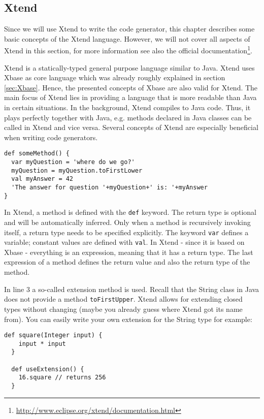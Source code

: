 \subsection{Xtend}
 
Since we will use Xtend to write the code generator, this chapter describes some
basic concepts of the Xtend language. However, we will not cover all aspects of
Xtend in this section, for more information see also the official documentation\footnote{\url{http://www.eclipse.org/xtend/documentation.html}}.

Xtend is a statically-typed general purpose language similar to Java. Xtend uses
Xbase as core language which was already roughly explained in section \ref{sec:Xbase}.
Hence, the presented concepts of Xbase are also valid for Xtend. The main focus
of Xtend lies in providing a language that is more readable than Java in certain
situations. In the background, Xtend compiles to Java code. Thus, it plays
perfectly together with Java, e.g. methods declared in Java classes can be called in Xtend
and vice versa. Several concepts of Xtend are especially beneficial when writing code
generators. 

\begin{lstlisting}[language=Xtend]
def someMethod() {
  var myQuestion = 'where do we go?'
  myQuestion = myQuestion.toFirstLower
  val myAnswer = 42
  'The answer for question '+myQuestion+' is: '+myAnswer
}
\end{lstlisting}

In Xtend, a method is defined with the \texttt{def} keyword. The return type is
optional and will be automatically inferred. Only when a method is recursively
invoking itself, a return type needs to be specified explicitly. The keyword 
\texttt{var} defines a variable; constant values are defined with \texttt{val}.
In Xtend - since it is based on Xbase - everything is an expression, meaning that 
it has a return type. The last expression of a method defines the return value
and also the return type of the method.

In line 3 a so-called extension method is used. Recall that the String class in 
Java does not provide a method \texttt{toFirstUpper}. Xtend allows for extending
closed types without changing (maybe you already guess where Xtend got its name from).
You can easily write your own extension for the String type for example:

\begin{lstlisting}[language=Xtend]
  def square(Integer input) {
  	input * input
  }
  
  def useExtension() {
  	16.square // returns 256
  }
\end{lstlisting}


